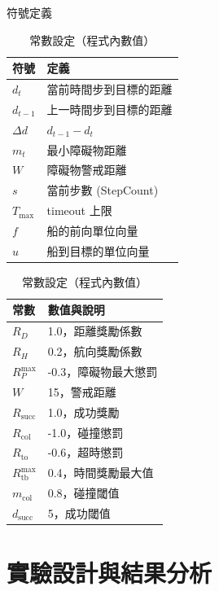 \documentclass[12pt,a4paper]{article}
\begin{document}
\renewcommand{\arraystretch}{1.3} %
\begin{table}[h!]
\centering
\begin{minipage}{0.48\textwidth}
\centering
\caption{符號定義}
\vspace*{0.2cm}
\begin{tabular}{ll}
\hline
\textbf{符號} & \textbf{定義} \\
\hline
$d_t$ & 當前時間步到目標的距離 \\
$d_{t-1}$ & 上一時間步到目標的距離 \\
$\Delta d$ & $d_{t-1} - d_t$ \\
$m_t$ & 最小障礙物距離 \\
$W$ & 障礙物警戒距離 \\
$s$ & 當前步數 (StepCount) \\
$T_{\max}$ & timeout 上限 \\
$f$ & 船的前向單位向量 \\
$u$ & 船到目標的單位向量 \\
\hline
\end{tabular}
\end{minipage}
\hfill
\begin{minipage}{0.48\textwidth}
\centering
\caption{常數設定（程式內數值）}
\vspace*{0.2cm}
\begin{tabular}{ll}
\hline
\textbf{常數} & \textbf{數值與說明} \\
\hline
$R_D$ & 1.0，距離獎勵係數 \\
$R_H$ & 0.2，航向獎勵係數 \\
$R_P^{\max}$ & -0.3，障礙物最大懲罰 \\
$W$ & 15，警戒距離 \\
$R_{\text{succ}}$ & 1.0，成功獎勵 \\
$R_{\text{col}}$ & -1.0，碰撞懲罰 \\
$R_{\text{to}}$ & -0.6，超時懲罰 \\
$R_{\text{tb}}^{\max}$ & 0.4，時間獎勵最大值 \\
$m_{\text{col}}$ & 0.8，碰撞閾值 \\
$d_{\text{succ}}$ & 5，成功閾值 \\
\hline
\end{tabular}
\end{minipage}
\end{table}

\newpage

\section{實驗設計與結果分析}
\end{document}
